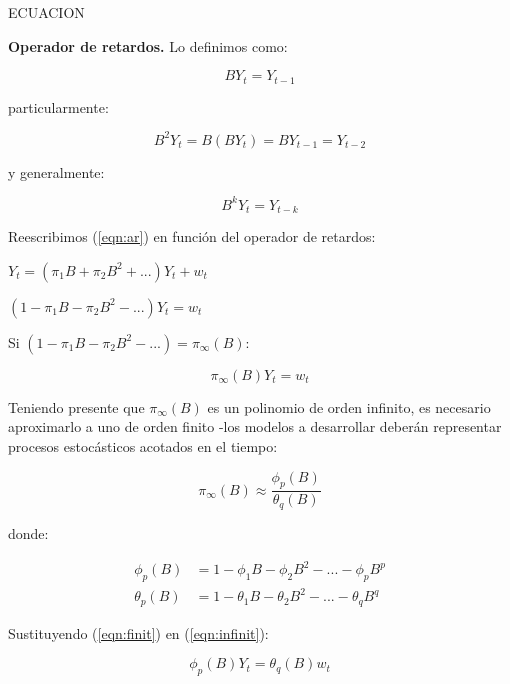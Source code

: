 \documentclass[a4paper,10pt]{article}
\begin{document}
ECUACION

\textbf{Operador de retardos.} Lo definimos como:

\begin{equation}
BY_t = Y_{t-1}
\end{equation}

particularmente:

\begin{equation*}
B^2Y_t = B(BY_t) = BY_{t-1} = Y_{t-2}
\end{equation*}

y generalmente:

\begin{equation}
B^kY_t = Y_{t-k}
\end{equation}

Reescribimos (\ref{eqn:ar}) en función del operador de retardos:

\begin{center}
$Y_t = (\pi_1B + \pi_2B^2 + ...) Y_t + w_t$

$(1-\pi_1B - \pi_2 B^2 - ...) Y_t = w_t$
\end{center}

Si $(1-\pi_1B - \pi_2 B^2 - ...) = \pi_\infty(B)$:

\begin{equation}\label{eqn:infinit}
\pi_\infty(B)Y_t = w_t
\end{equation}

Teniendo presente que $\pi_\infty(B)$ es un polinomio de orden infinito, es necesario aproximarlo a uno de orden finito -los modelos a desarrollar deberán representar procesos estocásticos acotados en el tiempo:

\begin{equation}\label{eqn:finit}
\pi_\infty(B) \approx \frac{\phi_p(B)}{\theta_q(B)}
\end{equation}

donde:

\begin{equation}
\begin{split}
\phi_p(B) &= 1 - \phi_1B - \phi_2B^2 - ... - \phi_pB^p \\
\theta_p(B) &= 1 - \theta_1B - \theta_2B^2 - ... - \theta_qB^q
\end{split}
\end{equation}

Sustituyendo (\ref{eqn:finit}) en (\ref{eqn:infinit}):

\begin{equation}
\phi_p(B) Y_t = \theta_q (B) w_t
\end{equation}
\end{document}
